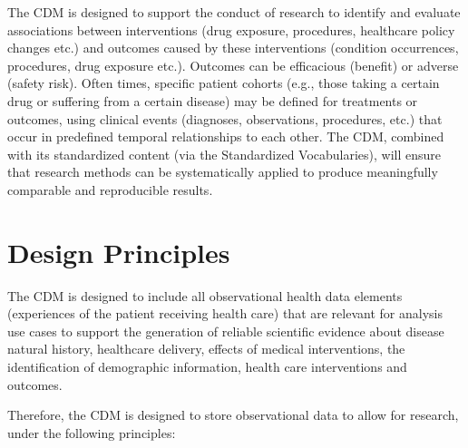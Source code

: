\documentclass[]{book}
\begin{document}
The CDM is designed to support the conduct of research to identify and
evaluate associations between interventions (drug exposure, procedures,
healthcare policy changes etc.) and outcomes caused by these
interventions (condition occurrences, procedures, drug exposure etc.).
Outcomes can be efficacious (benefit) or adverse (safety risk). Often
times, specific patient cohorts (e.g., those taking a certain drug or
suffering from a certain disease) may be defined for treatments or
outcomes, using clinical events (diagnoses, observations, procedures,
etc.) that occur in predefined temporal relationships to each other. The
CDM, combined with its standardized content (via the Standardized
Vocabularies), will ensure that research methods can be systematically
applied to produce meaningfully comparable and reproducible results.

\section{Design Principles}\label{design-principles}

The CDM is designed to include all observational health data elements
(experiences of the patient receiving health care) that are relevant for
analysis use cases to support the generation of reliable scientific
evidence about disease natural history, healthcare delivery, effects of
medical interventions, the identification of demographic information,
health care interventions and outcomes.

Therefore, the CDM is designed to store observational data to allow for
research, under the following principles:
\end{document}
